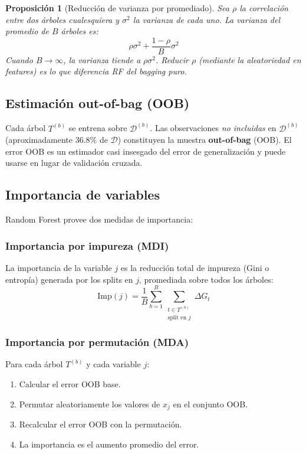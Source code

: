 \documentclass[12pt, a4paper]{article}
\theoremstyle{definition}
\theoremstyle{plain}
\newtheorem{proposicion}{Proposición}[section]
\theoremstyle{remark}
\begin{document}
\begin{proposicion}[Reducción de varianza por promediado]
  Sea $\rho$ la correlación entre dos árboles cualesquiera y $\sigma^2$ la varianza de cada uno. La varianza del promedio de $B$ árboles es:
  \[
    \rho \sigma^2 + \frac{1-\rho}{B}\sigma^2
  \]
  Cuando $B \to \infty$, la varianza tiende a $\rho\sigma^2$. Reducir $\rho$ (mediante la aleatoriedad en features) es lo que diferencia RF del bagging puro.
\end{proposicion}

\subsection{Estimación out-of-bag (OOB)}

Cada árbol $T^{(b)}$ se entrena sobre $\mathcal{D}^{(b)}$. Las observaciones \emph{no incluidas} en $\mathcal{D}^{(b)}$ (aproximadamente $36.8\%$ de $\mathcal{D}$) constituyen la muestra \textbf{out-of-bag} (OOB). El error OOB es un estimador casi insesgado del error de generalización y puede usarse en lugar de validación cruzada.

\subsection{Importancia de variables}

Random Forest provee dos medidas de importancia:

\subsubsection{Importancia por impureza (MDI)}

La importancia de la variable $j$ es la reducción total de impureza (Gini o entropía) generada por los splits en $j$, promediada sobre todos los árboles:
\[
  \text{Imp}(j) = \frac{1}{B} \sum_{b=1}^{B} \sum_{\substack{t \in T^{(b)} \\ \text{split en }j}} \Delta G_t
\]

\subsubsection{Importancia por permutación (MDA)}

Para cada árbol $T^{(b)}$ y cada variable $j$:
\begin{enumerate}
  \item Calcular el error OOB base.
  \item Permutar aleatoriamente los valores de $x_j$ en el conjunto OOB.
  \item Recalcular el error OOB con la permutación.
  \item La importancia es el aumento promedio del error.
\end{enumerate}
\end{document}
